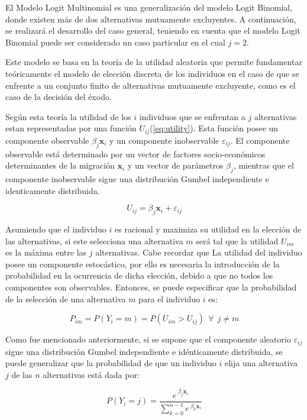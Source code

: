 \documentclass[12pt,a4paper]{article}
\begin{document}
El Modelo Logit Multinomial es una generalización del modelo Logit Binomial, donde existen más de dos alternativas mutuamente excluyentes. A continuación, se realizará el desarrollo del caso general, teniendo en cuenta que el modelo Logit Binomial puede ser considerado un caso particular en el cual $j=2$.

Este modelo se basa en la teoría de la utilidad aleatoria \parencite{domencich_urban_1975} que permite fundamentar teóricamente el modelo de elección discreta de los individuos en el caso de que se enfrente a un conjunto finito de alternativas mutuamente excluyente, como es el caso de la decisión del éxodo.

Según esta teoría la utilidad de los $i$ individuos que se enfrentan a $j$ alternativas estan representadas por una función $U_{ij}$(\ref{eq:utility}). Esta función posee un componente observable $\beta_{j} \textbf{x}_{i}$ y un componente inobservable $\varepsilon_{ij}$. El componente observable está determinado por un vector de factores socio-económicos determinantes de la migración $\textbf{x}_{i}$ y un vector de parámetros $\beta_{j}$, mientras que el componente inobservable sigue una distribución  Gumbel independiente e identicamente distribuida.
\begin {center}
\begin{equation}\label{eq:utility}
U_{ij}=\beta_{j} \textbf{x}_{i}+\varepsilon_{ij}
\end{equation}
\end {center}

Asumiendo que el individuo $i$ es racional y maximiza su utilidad en la elección de las  alternativas, si este selecciona una alternativa $m$ será tal que la utilidad $U_{im}$ es la máxima entre las $j$ alternativas. Cabe recordar que La utilidad del individuo posee un componente estocástico, por ello es necesaria la introducción de la probabilidad en la ocurrencia de dicha elección, debido a que no todos los componentes son observables. Entonces, se puede especificar que  la probabilidad de la selección de una alternativa $m$ para el individuo $i$ es:
\begin {center}
\begin{equation}\label{eq:prob}
P_{im}=P{(Y_{i}=m)} =P(U_{im}>U_{ij}) \ \ \forall \ \ j\neq m
\end{equation}
\end {center}

Como fue mencionado anteriormente, si se supone que el componente aleatorio $\varepsilon_{ij}$ sigue una distribución Gumbel independiente e idénticamente distribuida, se puede generalizar que la probabilidad de que un individuo $i$ elija una alternativa $j$ de las $n$ alternativas está dada por:
\begin {center}
\begin{equation}\label{eq:multinom}
P{(Y_{i}=j)}=\frac{e^{\ \beta_{j} \textbf{x}_{i}}}{\sum_{k=0}^{n-1}e^{\ \beta_{k} \textbf{x}_{i}}}
\end{equation}
\end {center}
\end{document}
